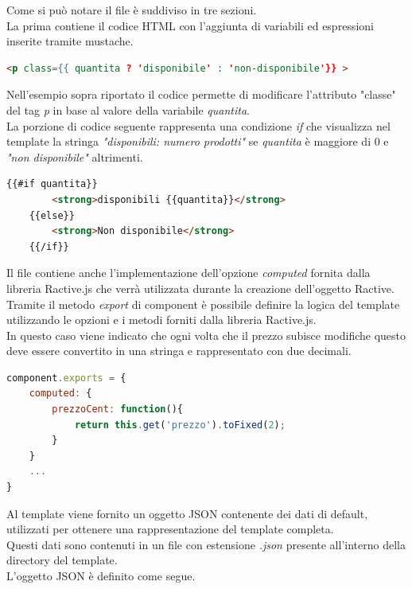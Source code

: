 Come si può notare il file è suddiviso in tre sezioni.\\
La prima contiene il codice HTML con l'aggiunta di variabili ed espressioni inserite tramite mustache.

\begin{lstlisting}[language=HTML, caption= Espressione con mustache.]
<p class={{ quantita ? 'disponibile' : 'non-disponibile'}} >
\end{lstlisting}

Nell'esempio sopra riportato il codice permette di modificare l'attributo "classe" del tag \textit{p} in base al valore della variabile \textit{quantita}.\\
La porzione di codice seguente rappresenta una condizione \textit{if} che visualizza nel template la stringa \textit{"disponibili: numero prodotti"} se \textit{quantita} è maggiore di 0 e \textit{"non disponibile"} altrimenti.

\newpage

\begin{lstlisting}[language=HTML, caption=Condizione if-else con mustache.]
	{{#if quantita}}
		<strong>disponibili {{quantita}}</strong>
	{{else}}
		<strong>Non disponibile</strong>
	{{/if}}
\end{lstlisting}

Il file contiene anche l'implementazione dell'opzione \textit{computed} fornita dalla libreria Ractive.js che verrà utilizzata durante la creazione dell'oggetto Ractive.\\
Tramite il metodo \textit{export} di component è possibile definire la logica del template utilizzando le opzioni e i metodi forniti dalla libreria Ractive.js.\\
In questo caso viene indicato che ogni volta che il prezzo subisce modifiche questo deve essere convertito in una stringa e rappresentato con due decimali.

\begin{lstlisting}[language=JavaScript, caption=Implementazione ed esportazione opzione \textit{computed}.]
component.exports = {
	computed: {
		prezzoCent: function(){
			return this.get('prezzo').toFixed(2);
		}
	}
	...
}
\end{lstlisting}

Al template viene fornito un oggetto JSON contenente dei dati di default, utilizzati per ottenere una rappresentazione del template completa.\\
Questi dati sono contenuti in un file con estensione \textit{.json} presente all'interno della directory del template.\\
L'oggetto JSON è definito come segue.

